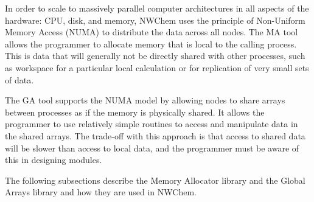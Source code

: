 
\label{sec:numa}


In order to scale to massively parallel computer 
architectures in all aspects of the hardware: CPU, disk,
and memory, NWChem uses the principle of Non-Uniform Memory Access (NUMA)
to distribute the data across all nodes.
The MA tool allows the programmer to allocate memory that is local to
the calling process.  This is data that will generally not be directly
shared with other processes, such as workspace for a particular local
calculation or for replication of very small sets of data.

The GA tool supports the NUMA model by allowing nodes to share arrays between
processes as if the memory is physically shared.  It allows the
programmer to use relatively simple routines to access and manipulate
data in the shared arrays.  The trade-off with this approach is that
access to shared data will be slower than access
to local data, and the programmer must be aware of this in designing modules.

The following subsections describe the Memory Allocator library and 
the Global Arrays library and how they are used in NWChem.

